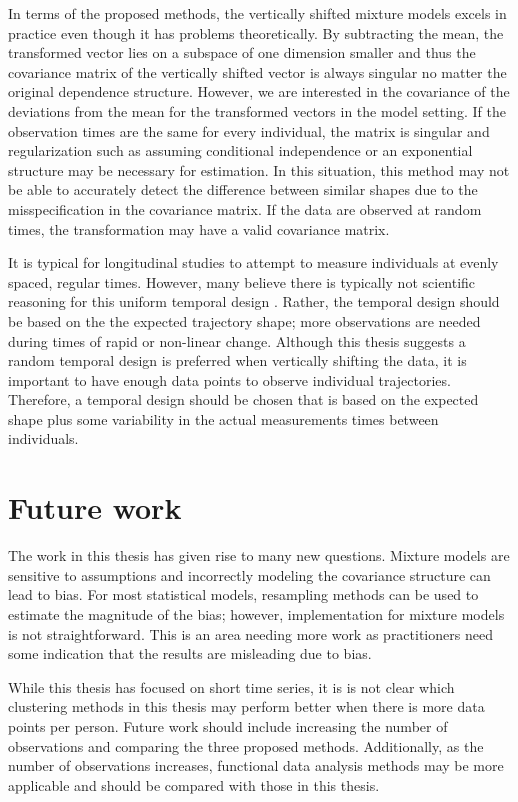 In terms of the proposed methods, the vertically shifted mixture models excels in practice even though it has problems theoretically. By subtracting the mean, the transformed vector lies on a subspace of one dimension smaller and thus the covariance matrix of the vertically shifted vector is always singular no matter the original dependence structure. However, we are interested in the covariance of the deviations from the mean for the transformed vectors in the model setting. If the observation times are the same for every individual, the matrix is singular and regularization such as assuming conditional independence or an exponential structure may be necessary for estimation. In this situation, this method may not be able to accurately detect the difference between similar shapes due to the misspecification in the covariance matrix. If the data are observed at random times, the transformation may have a valid covariance matrix. 

It is typical for longitudinal studies to attempt to measure individuals at evenly spaced, regular times. However, many believe there is typically not scientific reasoning for this uniform temporal design \cite{collins2006}. Rather, the temporal design should be based on the the expected trajectory shape; more observations are needed during times of rapid or non-linear change. Although this thesis suggests a random temporal design is preferred when vertically shifting the data, it is important to have enough data points to observe individual trajectories. Therefore, a temporal design should be chosen that is based on the expected shape plus some variability in the actual measurements times between individuals. 

\section{Future work}
The work in this thesis has given rise to many new questions. Mixture models are sensitive to assumptions and incorrectly modeling the covariance structure can lead to bias. For most statistical models, resampling methods can be used to estimate the magnitude of the bias; however, implementation for mixture models is not straightforward. This is an area needing more work as practitioners need some indication that the results are misleading due to bias. 

While this thesis has focused on short time series, it is is not clear which clustering methods in this thesis may perform better when there is more data points per person. Future work should include increasing the number of observations and comparing the three proposed methods. Additionally, as the number of observations increases, functional data analysis methods may be more applicable and should be compared with those in this thesis.

